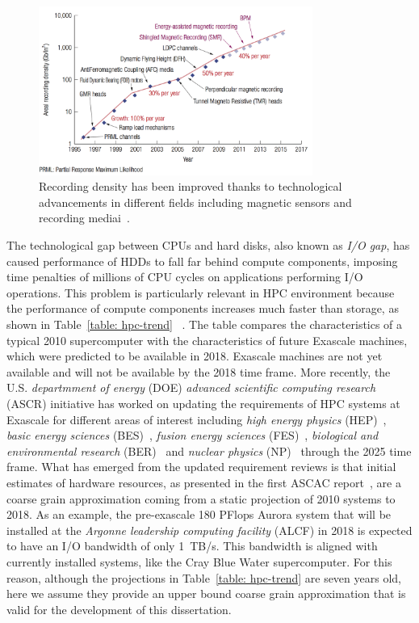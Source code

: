 \begin{figure}[!htb]
\centering
\includegraphics[width=0.8\textwidth]{figures/hdd-trend}
\caption{Recording density has been improved thanks to technological advancements in different fields including magnetic sensors and recording mediai~\cite{Shiroishi2009}.}
\label{figure: hdd-trend}
\end{figure}

The technological gap between CPUs and hard disks, also known as \textit{I/O gap}, has caused performance of HDDs to fall far behind compute components, imposing time penalties of millions of CPU cycles on 
applications performing I/O operations. This problem is particularly relevant in HPC environment because the performance of compute components increases much faster than storage, as shown in Table~\ref{table: hpc-trend}
~\cite{ASCAC2010}. The table compares the characteristics of a typical 2010 supercomputer with the characteristics of future Exascale machines, which were predicted to be available in 2018. Exascale machines are not yet 
available and will not be available by the 2018 time frame. More recently, the U.S. \textit{departmment of energy} (DOE) \textit{advanced scientific computing research} (ASCR) initiative has worked on updating the requirements 
of HPC systems at Exascale for different areas of interest including \textit{high energy physics} (HEP)~\cite{HEP2015}, \textit{basic energy sciences} (BES)~\cite{BES2015}, \textit{fusion energy sciences} (FES)~\cite{FES2016}, 
\textit{biological and environmental research} (BER)~\cite{BER2016} and \textit{nuclear physics} (NP)~\cite{NP2016} through the 2025 time frame. What has emerged from the updated requirement reviews is that initial estimates of
hardware resources, as presented in the first ASCAC report~\cite{ASCAC2010}, are a coarse grain approximation coming from a static projection of 2010 systems to 2018. As an example, the pre-exascale 180 PFlops Aurora system that 
will be installed at the \textit{Argonne leadership computing facility} (ALCF) in 2018 is expected to have an I/O bandwidth of only 1~TB/s. This bandwidth is aligned with currently installed systems, like the Cray Blue Water 
supercomputer. For this reason, although the projections in Table~\ref{table: hpc-trend} are seven years old, here we assume they provide an upper bound coarse grain approximation that is valid for the development of this
dissertation.


